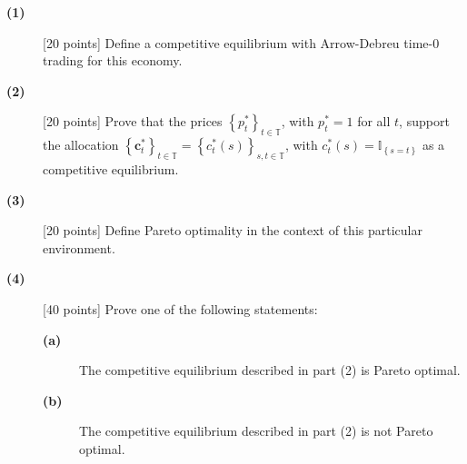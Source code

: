 \documentclass[11pt]{article}
\begin{document}
\begin{description}
\item[\textbf{(1)} ] [20 points] Define a competitive equilibrium with
Arrow-Debreu time-0 trading for this economy.

\item[\textbf{(2) }] [20 points] Prove that the prices $\left\{ p_{t}^{\ast
}\right\} _{t\in \mathbb{T}}$, with $p_{t}^{\ast }=1$ for all $t$, support
the allocation $\left\{ \boldsymbol{c}_{t}^{\ast }\right\} _{t\in \mathbb{T}%
}=\left\{ c_{t}^{\ast }\left( s\right) \right\} _{s,t\in \mathbb{T}}$, with $%
c_{t}^{\ast }\left( s\right) =\mathbb{I}_{\left\{ s=t\right\} }$ as a
competitive equilibrium.

\item[\textbf{(3)} ] [20 points] Define Pareto optimality in the context of
this particular environment.

\item[\textbf{(4) }] [40 points] Prove one of the following statements:

\begin{description}
\item[\textbf{(a)} ] The competitive equilibrium described in part (2) is
Pareto optimal.

\item[\textbf{(b) }] The competitive equilibrium described in part (2) is
not Pareto optimal.
\end{description}
\end{description}
\end{document}
